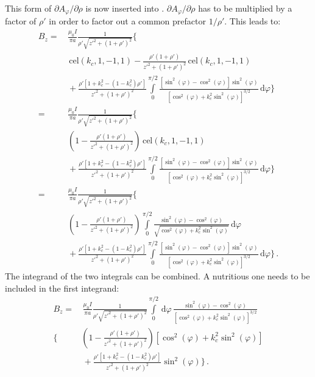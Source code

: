 This form of $\partial A_\varphi / \partial \rho$ is now inserted into .
$\partial A_\varphi / \partial \rho$ has to be multiplied by a factor of $\rho'$ in order to factor out a common prefactor $1/\rho'$.
This leads to:
\begin{align}
  B_z
 =&\, \frac{\mu_0 I}{\pi a}
      \frac{1}{\rho' \sqrt{z'^2 + (1 + \rho')^2}} \Biggl\{ \nonumber \\
 ~&\, \,\mathrm{cel}(k_c, 1, -1, 1) - \frac{\rho' (1+\rho')}{z'^2 + (1 + \rho')^2} \,\mathrm{cel}(k_c, 1, -1, 1) \nonumber \\
 ~&\, + \frac{\rho' \left[1 + k_c^2 - (1 - k_c^2) \rho'\right]}{z'^2 + (1 + \rho')^2}
          \int\limits_0^{\pi/2}
          \frac{\left[\sin^2(\varphi) - \cos^2(\varphi) \right] \sin^2(\varphi)}
               {\left[\cos^2(\varphi) + k_c^2 \sin^2(\varphi) \right]^{3/2}}  \,\mathrm{d}\varphi \Biggr\} \nonumber \\
 =&\, \frac{\mu_0 I}{\pi a}
      \frac{1}{\rho' \sqrt{z'^2 + (1 + \rho')^2}} \Biggl\{ \nonumber \\
 ~&\, \left( 1 - \frac{\rho' (1+\rho')}{z'^2 + (1 + \rho')^2}\right) \,\mathrm{cel}(k_c, 1, -1, 1) \nonumber \\
 ~&\, + \frac{\rho' \left[1 + k_c^2 - (1 - k_c^2) \rho'\right]}{z'^2 + (1 + \rho')^2}
          \int\limits_0^{\pi/2}
          \frac{\left[\sin^2(\varphi) - \cos^2(\varphi) \right] \sin^2(\varphi)}
               {\left[\cos^2(\varphi) + k_c^2 \sin^2(\varphi) \right]^{3/2}}  \,\mathrm{d}\varphi \Biggr\} \nonumber \\
 =&\, \frac{\mu_0 I}{\pi a}
      \frac{1}{\rho' \sqrt{z'^2 + (1 + \rho')^2}} \Biggl\{ \nonumber \\
 ~&\, \left( 1 - \frac{\rho' (1+\rho')}{z'^2 + (1 + \rho')^2}\right)
      \int\limits_0^{\pi/2}
        \frac{\sin^2(\varphi) - \cos^2(\varphi)}
             {\sqrt{\cos^2(\varphi) + k_c^2 \sin^2(\varphi)}} \,\mathrm{d}\varphi \nonumber \\
 ~&\, + \frac{\rho' \left[1 + k_c^2 - (1 - k_c^2) \rho'\right]}{z'^2 + (1 + \rho')^2}
          \int\limits_0^{\pi/2}
          \frac{\left[\sin^2(\varphi) - \cos^2(\varphi) \right] \sin^2(\varphi)}
               {\left[\cos^2(\varphi) + k_c^2 \sin^2(\varphi) \right]^{3/2}}  \,\mathrm{d}\varphi \Biggr\} \, .
\end{align}
The integrand of the two integrals can be combined.
A nutritious one needs to be included in the first integrand:
\begin{align}
  B_z
 =&\, \frac{\mu_0 I}{\pi a}
      \frac{1}{\rho' \sqrt{z'^2 + (1 + \rho')^2}}
      \int\limits_0^{\pi/2} \,\mathrm{d}\varphi\,
        \frac{\sin^2(\varphi) - \cos^2(\varphi)}
             {\left[\cos^2(\varphi) + k_c^2 \sin^2(\varphi) \right]^{3/2}} \nonumber \\
 \Biggl\{ &\left( 1 - \frac{\rho' (1+\rho')}{z'^2 + (1 + \rho')^2} \right)
            \left[ \cos^2(\varphi) + k_c^2 \sin^2(\varphi) \right] \nonumber \\
 ~&\,     + \frac{\rho' \left[1 + k_c^2 - (1 - k_c^2) \rho'\right]}{z'^2 + (1 + \rho')^2} \sin^2(\varphi)
        \Biggr\} \, .
\end{align}
